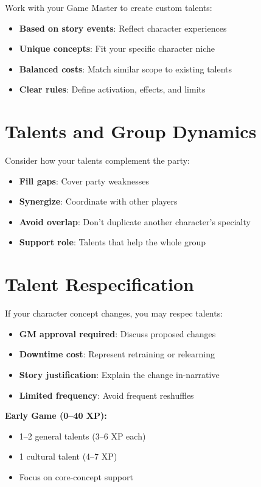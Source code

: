 \begin{multicols}{2}
Work with your Game Master to create custom talents:
\begin{itemize}
\item \textbf{Based on story events}: Reflect character experiences
\item \textbf{Unique concepts}: Fit your specific character niche
\item \textbf{Balanced costs}: Match similar scope to existing talents
\item \textbf{Clear rules}: Define activation, effects, and limits
\end{itemize}

\section{Talents and Group Dynamics}

Consider how your talents complement the party:
\begin{itemize}
\item \textbf{Fill gaps}: Cover party weaknesses
\item \textbf{Synergize}: Coordinate with other players
\item \textbf{Avoid overlap}: Don’t duplicate another character’s specialty
\item \textbf{Support role}: Talents that help the whole group
\end{itemize}

\section{Talent Respecification}

If your character concept changes, you may respec talents:
\begin{itemize}
\item \textbf{GM approval required}: Discuss proposed changes
\item \textbf{Downtime cost}: Represent retraining or relearning
\item \textbf{Story justification}: Explain the change in-narrative
\item \textbf{Limited frequency}: Avoid frequent reshuffles
\end{itemize}

\begin{tcolorbox}[colback=purple!5!white,colframe=purple!75!black,title=Talent Selection Guide,fonttitle=\bfseries]
\textbf{Early Game (0--40 XP):}
\begin{itemize}
\item 1--2 general talents (3--6 XP each)
\item 1 cultural talent (4--7 XP)
\item Focus on core-concept support
\end{itemize}


\end{tcolorbox}
\end{multicols}
